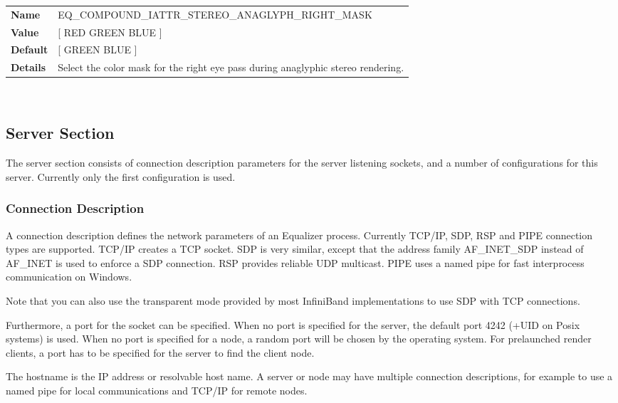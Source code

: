 \documentclass[10pt,a4]{scrartcl}
\begin{document}
\begin{center}
\begin{tabularx}{\textwidth}{|l|X|}
  \hline
  \textbf{Name} & EQ\_COMPOUND\_IATTR\_STEREO\_ANAGLYPH\_RIGHT\_MASK\\
  \textbf{Value} & [ RED GREEN BLUE ]\\
  \textbf{Default} & [ GREEN BLUE ]\\
  \textbf{Details} & Select the color mask for the right eye pass during
  anaglyphic stereo rendering.\\
  \hline
\end{tabularx}\\\vfill
\end{center}

\subsection{Server Section}

The server section consists of connection description parameters for the
server listening sockets, and a number of configurations for this
server. Currently only the first configuration is used.

\subsubsection{\label{sConnectionDescription}Connection Description}

A connection description defines the network parameters of an Equalizer
process. Currently TCP/IP, SDP, RSP and PIPE connection types are
supported. TCP/IP creates a TCP socket. SDP is very similar, except that the
address family \textsf{AF\_INET\_SDP} instead of \textsf{AF\_INET} is used to
enforce a SDP connection. RSP provides reliable UDP multicast. PIPE uses a named
pipe for fast interprocess communication on Windows.

Note that you can also use the transparent mode provided by most
InfiniBand implementations to use SDP with TCP connections.

Furthermore, a port for the socket can be specified. When no port is specified
for the server, the default port 4242 (+UID on Posix systems) is used. When no
port is specified for a node, a random port will be chosen by the operating
system. For prelaunched render clients, a port has to be specified for the
server to find the client node.

The hostname is the IP address or resolvable host name. A server or
node may have multiple connection descriptions, for example to use a
named pipe for local communications and TCP/IP for remote nodes.
\end{document}
